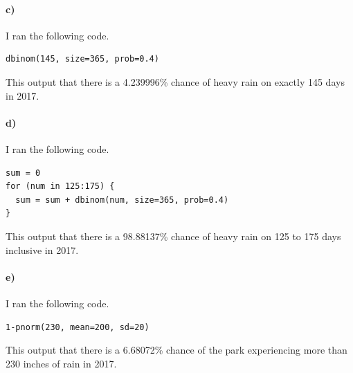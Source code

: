 \documentclass[12pt]{article}
\begin{document}
\paragraph{c)}

I ran the following code.
\begin{verbatim}
dbinom(145, size=365, prob=0.4)
\end{verbatim}
This output that there is a 4.239996\% chance of heavy rain on exactly 145 days
in 2017.

\paragraph{d)}

I ran the following code.
\begin{verbatim}
sum = 0
for (num in 125:175) {
  sum = sum + dbinom(num, size=365, prob=0.4)
}
\end{verbatim}
This output that there is a 98.88137\% chance of heavy rain on 125 to 175 days inclusive
in 2017.

\paragraph{e)}

I ran the following code.
\begin{verbatim}
1-pnorm(230, mean=200, sd=20)
\end{verbatim}
This output that there is a 6.68072\% chance of the park experiencing more than 230 inches
of rain in 2017.
\end{document}
